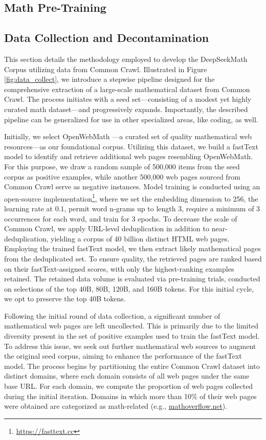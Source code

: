 \begin{itemize}[topsep=0pt]
\section{Math Pre-Training}

\subsection{Data Collection and Decontamination} This section details the methodology employed to develop the DeepSeekMath Corpus utilizing data from Common Crawl. Illustrated in Figure \ref{fig:data_collect}, we introduce a stepwise pipeline designed for the comprehensive extraction of a large-scale mathematical dataset from Common Crawl. The process initiates with a seed set—consisting of a modest yet highly curated math dataset—and progressively expands. Importantly, the described pipeline can be generalized for use in other specialized areas, like coding, as well.

Initially, we select OpenWebMath \citep{openwebmath}—a curated set of quality mathematical web resources—as our foundational corpus. Utilizing this dataset, we build a fastText model \citep{joulin2016fasttext} to identify and retrieve additional web pages resembling OpenWebMath. For this purpose, we draw a random sample of 500,000 items from the seed corpus as positive examples, while another 500,000 web pages sourced from Common Crawl serve as negative instances. Model training is conducted using an open-source implementation\footnote{\url{https://fasttext.cc}}, where we set the embedding dimension to 256, the learning rate at 0.1, permit word n-grams up to length 3, require a minimum of 3 occurrences for each word, and train for 3 epochs. To decrease the scale of Common Crawl, we apply URL-level deduplication in addition to near-deduplication, yielding a corpus of 40 billion distinct HTML web pages. Employing the trained fastText model, we then extract likely mathematical pages from the deduplicated set. To ensure quality, the retrieved pages are ranked based on their fastText-assigned scores, with only the highest-ranking examples retained. The retained data volume is evaluated via pre-training trials, conducted on selections of the top 40B, 80B, 120B, and 160B tokens. For this initial cycle, we opt to preserve the top 40B tokens.

Following the initial round of data collection, a significant number of mathematical web pages are left uncollected. This is primarily due to the limited diversity present in the set of positive examples used to train the fastText model. To address this issue, we seek out further mathematical web sources to augment the original seed corpus, aiming to enhance the performance of the fastText model. The process begins by partitioning the entire Common Crawl dataset into distinct domains, where each domain consists of all web pages under the same base URL. For each domain, we compute the proportion of web pages collected during the initial iteration. Domains in which more than 10\% of their web pages were obtained are categorized as math-related (e.g., \url{mathoverflow.net}).


\end{itemize}
